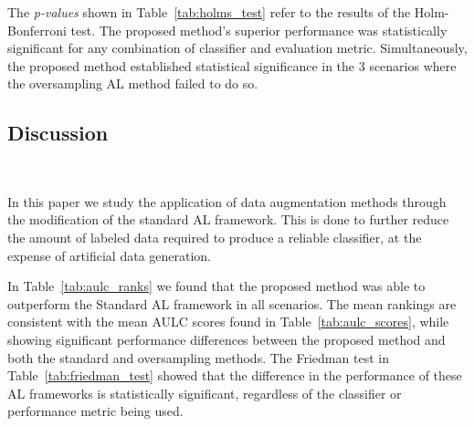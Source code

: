 \documentclass[preprint, 12pt]{elsarticle}
\begin{document}
The \textit{p-values} shown in Table~\ref{tab:holms_test} refer to the results
of the Holm-Bonferroni test. The proposed method's superior performance was
statistically significant for any combination of classifier and evaluation
metric. Simultaneously, the proposed method established statistical
significance in the 3 scenarios where the oversampling AL method failed to do
so.

\begin{table}
	\centering
    \caption{%
        Adjusted p-values using the Holm-Bonferroni method. Bold values are
        statistically significant at a level of $\alpha = 0.05$. The null
        hypothesis is that the Oversampling or Proposed method does not
        perform better than the control method (Standard AL framework).
    }\label{tab:holms_test}
\end{table}

\subsection{Discussion}~\label{sec:sub_discussion}

In this paper we study the application of data augmentation methods through
the modification of the standard AL framework. This is done to further reduce
the amount of labeled data required to produce a reliable classifier, at the
expense of artificial data generation.
 
In Table~\ref{tab:aulc_ranks} we found that the proposed method was able to
outperform the Standard AL framework in all scenarios. The mean rankings are
consistent with the mean AULC scores found in Table~\ref{tab:aulc_scores},
while showing significant performance differences between the proposed method
and both the standard and oversampling methods. The Friedman test in
Table~\ref{tab:friedman_test} showed that the difference in the performance of
these AL frameworks is statistically significant, regardless of the
classifier or performance metric being used.
 
\end{document}
